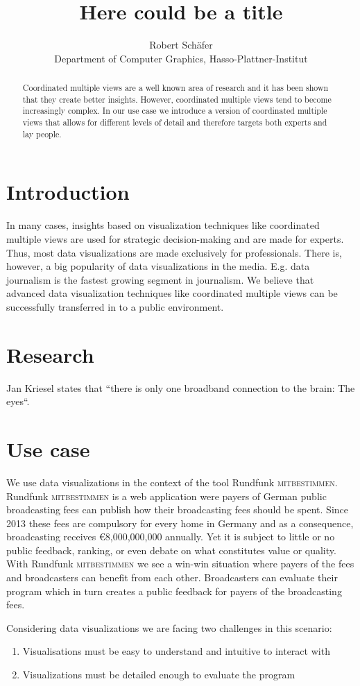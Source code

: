 \documentclass{article}
\begin{document}
\title{Here could be a title}\label{here-could-be-a-title}
\author{Robert Schäfer\\ Department of Computer Graphics, Hasso-Plattner-Institut}
\maketitle

\newcommand{\rufu}{Rundfunk \textsc{mitbestimmen}}

\begin{abstract}
Coordinated multiple views are a well known area of research and it has
been shown that they create better insights.
However, coordinated multiple views tend to become increasingly complex.
In our use case we introduce a version of coordinated multiple views that allows for different levels of detail and therefore targets both experts and lay people.
\end{abstract}

\section{Introduction}
In many cases, insights based on visualization techniques like coordinated multiple views are used for strategic decision-making and are made for experts.
Thus, most data visualizations are made exclusively for professionals.
There is, however, a big popularity of data visualizations in the media.
E.g. data journalism is the fastest growing segment in journalism.
We believe that advanced data visualization techniques like coordinated multiple views can be successfully transferred in to a public environment.

\section{Research}


Jan Kriesel states that ``there is only one broadband connection to the
brain: The eyes``.

\section{Use case}

We use data visualizations in the context of the tool \rufu{}.
\rufu{} is a web application were payers of German public broadcasting fees can publish how their broadcasting fees should be spent.
Since 2013 these fees are compulsory for every home in Germany and as a consequence, broadcasting receives €8,000,000,000 annually.
Yet it is subject to little or no public feedback, ranking, or even debate on what constitutes value or quality.
With \rufu{} we see a win-win situation where payers of the fees and broadcasters can benefit from each other.
Broadcasters can evaluate their program which in turn creates a public feedback for payers of the broadcasting fees.

Considering data visualizations we are facing two challenges in this scenario:
\begin{enumerate}
\item
Visualisations must be easy to understand and intuitive to interact with
\item
Visualizations must be detailed enough to evaluate the program
\end{enumerate}
\end{document}
